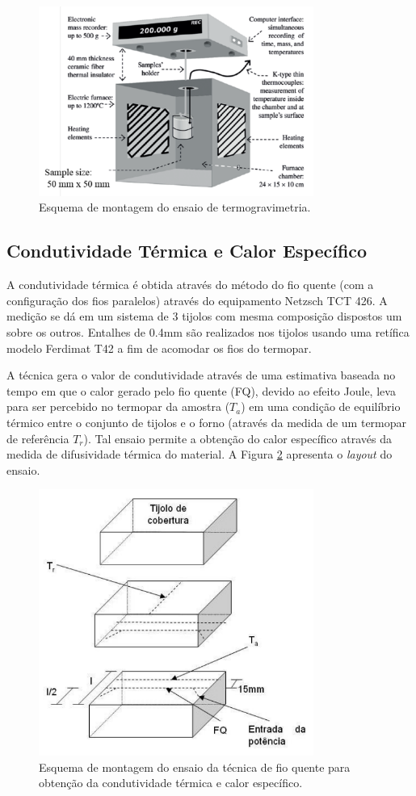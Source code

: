 \begin{figure}[ht]
	\centering
	\includegraphics[width=9cm]{./figures/TGA.pdf}
	\caption{Esquema de montagem do ensaio de termogravimetria. \label{fig:TGA}}
\end{figure}



\subsection{Condutividade Térmica e Calor Específico}\label{mat:condutividade}
A condutividade térmica é obtida através do método do fio quente (com a
configuração dos fios paralelos) através do equipamento Netzsch TCT 426. A
medição se dá em um sistema de 3 tijolos com mesma composição dispostos um sobre
os outros. Entalhes de 0.4mm são realizados nos tijolos usando uma retífica
modelo Ferdimat T42 a fim de acomodar os fios do termopar.

A técnica gera o valor de condutividade através de uma estimativa baseada no
tempo em que o calor gerado pelo fio quente (FQ), devido ao efeito Joule, leva
para ser percebido no termopar da amostra ($T_a$) em uma condição de equilíbrio
térmico entre o conjunto de tijolos e o forno (através da medida de um termopar
de referência $T_r$). Tal ensaio permite a obtenção do calor específico através
da medida de difusividade térmica do material. A Figura \ref{fig:fio_quente}
apresenta o {\it layout} do ensaio.

\begin{figure}[!ht]
	\centering
	\includegraphics[width=9cm]{./figures/fio_quente.pdf}
	\caption{Esquema de montagem do ensaio da técnica de fio quente para obtenção
    da condutividade térmica e calor específico. \label{fig:fio_quente}}
\end{figure}

